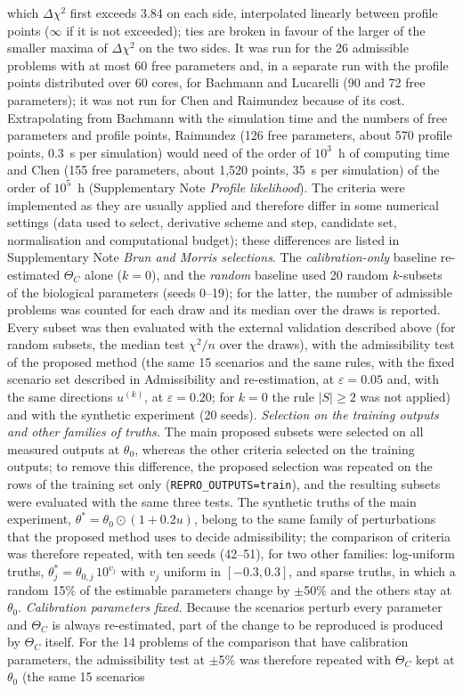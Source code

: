 \documentclass[pdflatex,sn-nature]{sn-jnl}
\theoremstyle{plain}
\begin{document}
which $\Delta\chi^2$ first exceeds 3.84 on each side, interpolated linearly between profile points ($\infty$ if it is not exceeded); ties are broken in favour of the larger of the smaller maxima of $\Delta\chi^2$ on the two sides. It was run for the 26 admissible problems with at most 60 free parameters and, in a separate run with the profile points distributed over 60 cores, for Bachmann and Lucarelli (90 and 72 free parameters); it was not run for Chen and Raimundez because of its cost. Extrapolating from Bachmann with the simulation time and the numbers of free parameters and profile points, Raimundez (126 free parameters, about 570 profile points, 0.3~s per simulation) would need of the order of $10^3$~h of computing time and Chen (155 free parameters, about 1,520 points, 35~s per simulation) of the order of $10^5$~h (Supplementary Note \textit{Profile likelihood}). The criteria were implemented as they are usually applied and therefore differ in some numerical settings (data used to select, derivative scheme and step, candidate set, normalisation and computational budget); these differences are listed in Supplementary Note \textit{Brun and Morris selections}. The \emph{calibration-only} baseline re-estimated $\Theta_C$ alone ($k=0$), and the \emph{random} baseline used 20 random $k$-subsets of the biological parameters (seeds 0--19); for the latter, the number of admissible problems was counted for each draw and its median over the draws is reported. Every subset was then evaluated with the external validation described above (for random subsets, the median test $\chi^2/n$ over the draws), with the admissibility test of the proposed method (the same 15 scenarios and the same rules, with the fixed scenario set described in Admissibility and re-estimation, at $\varepsilon=0.05$ and, with the same directions $u^{(k)}$, at $\varepsilon=0.20$; for $k=0$ the rule $|S|\ge2$ was not applied) and with the synthetic experiment (20 seeds). \label{met:comp-train}\emph{Selection on the training outputs and other families of truths.} The main proposed subsets were selected on all measured outputs at $\theta_0$, whereas the other criteria selected on the training outputs; to remove this difference, the proposed selection was repeated on the rows of the training set only (\texttt{REPRO\_OUTPUTS=train}), and the resulting subsets were evaluated with the same three tests. The synthetic truths of the main experiment, $\theta^\ast=\theta_0\odot(1+0.2u)$, belong to the same family of perturbations that the proposed method uses to decide admissibility; the comparison of criteria was therefore repeated, with ten seeds (42--51), for two other families: log-uniform truths, $\theta^\ast_j=\theta_{0,j}\,10^{v_j}$ with $v_j$ uniform in $[-0.3,0.3]$, and sparse truths, in which a random 15\% of the estimable parameters change by $\pm$50\% and the others stay at $\theta_0$. \label{met:comp-cal}\emph{Calibration parameters fixed.} Because the scenarios perturb every parameter and $\Theta_C$ is always re-estimated, part of the change to be reproduced is produced by $\Theta_C$ itself. For the 14 problems of the comparison that have calibration parameters, the admissibility test at $\pm$5\% was therefore repeated with $\Theta_C$ kept at $\theta_0$ (the same 15 scenarios 
\end{document}
